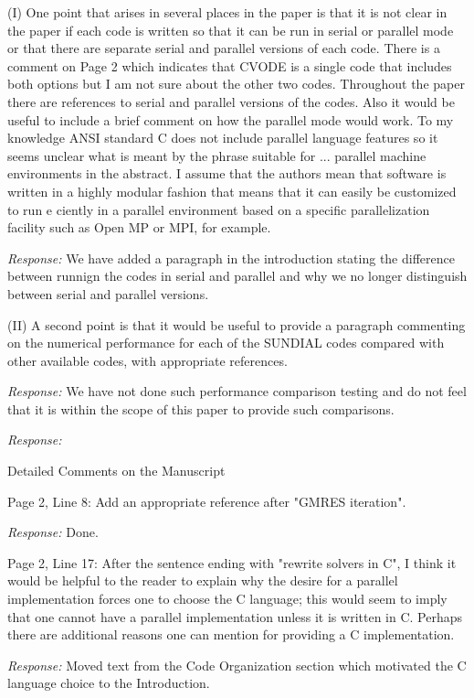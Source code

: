 \documentclass[12pt]{letter}
\begin{document}
(I) One point that arises in several places in the paper is that it is
not clear in the paper if each code is written so that it can be run
in serial or parallel mode or that there are separate serial and
parallel versions of each code. There is a comment on Page 2 which
indicates that CVODE is a single code that includes both options but I
am not sure about the other two codes.  Throughout the paper there are
references to serial and parallel versions of the codes.  Also it
would be useful to include a brief comment on how the parallel mode
would work.  To my knowledge ANSI standard C does not include parallel
language features so it seems unclear what is meant by the phrase
suitable for ... parallel machine environments in the abstract.  I
assume that the authors mean that software is written in a highly
modular fashion that means that it can easily be customized to run e
ciently in a parallel environment based on a specific parallelization
facility such as Open MP or MPI, for example.

{\em Response: } We have added a paragraph in the introduction
stating the difference between runnign the codes in serial and
parallel and why we no longer distinguish between serial and
parallel versions.

(II) A second point is that it would be useful to provide a
paragraph commenting on the numerical performance for each of the
SUNDIAL codes compared with other available codes, with
appropriate references.

{\em Response: } We have not done such performance comparison
testing and do not feel that it is within the scope of this paper
to provide such comparisons.

{\em Response: }

Detailed Comments on the Manuscript

Page 2, Line 8: Add an appropriate reference after "GMRES iteration".

{\em Response: } Done.

Page 2, Line 17: After the sentence ending with "rewrite solvers in C",
I think it would be helpful to the reader to explain why the desire
for a parallel implementation forces one to choose the C language;
this would seem to imply that one cannot have a parallel
implementation unless it is written in C. Perhaps there are additional
reasons one can mention for providing a C implementation.

{\em Response: } Moved text from the Code Organization section
which motivated the C language choice to the Introduction.
\end{document}

